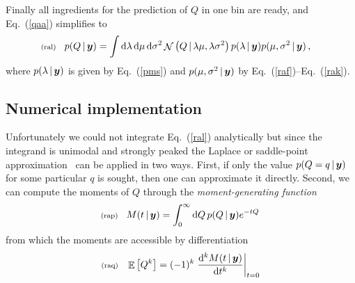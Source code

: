 \documentclass[11pt]{article}
\newcommand{\fredmargin}[1]{\todo[color=orange!40]{#1}} %
\newcommand{\lleq}[1]{\label{#1} }
\renewcommand{\lleq}[1]{\label{#1} {\scriptstyle {\rm (#1)}} \hspace*{2ex} }
\newcommand{\cond}{\,|\,}
\newcommand{\refeq}[1]{Eq.~(\ref{#1})}
\DeclareMathOperator{\Expect}{\mathbb{E}}
\newcommand{\expect}[1]{\Expect\left[#1\right]}
\DeclareMathOperator{\GaussianDist}{\mathcal{N}}
\newcommand{\Lumtot}{Q}
\newcommand{\lumtot}{q}
\newcommand{\rmdx}[1]{\dd{#1}} %
\begin{document}
  Finally all ingredients for the prediction of $\Lumtot$ in one bin are
  ready, and \refeq{qaa} simplifies to
\begin{align}
  \lleq{ral}
  p(\Lumtot \cond \bmy) &= \int \rmdx{\lambda} \rmdx{\mu} \rmdx{\sigma^2} \GaussianDist \left( \Lumtot \cond \lambda \mu, \lambda \sigma^2 \right) p(\lambda \cond \bmy) p( \mu, \sigma^2 \cond \bmy) \,,
\end{align}
where $ p(\lambda \cond \bmy)$ is given by \refeq{pms} and
$ p( \mu, \sigma^2 \cond \bmy)$ by
\refeq{raf}--\refeq{rak}.

\subsection{Numerical implementation}\label{sec:asympt-numeric}

Unfortunately we could not integrate \refeq{ral} analytically but
since the integrand is unimodal and strongly peaked the Laplace or
saddle-point approximation~\cite[Ch. 27]{mackay2003information} can be
applied in two ways. First, if only the value
$p(\Lumtot=\lumtot \cond \bmy)$ for some particular $q$ is sought,
then one can approximate it directly. Second, we can compute the
moments of $\Lumtot$ through the \emph{moment-generating
  function}\fredmargin{ref}
\begin{align}
  \lleq{rap}
  M(t \cond \bmy) = \int_0^{\infty} \rmdx{\Lumtot} p(\Lumtot \cond \bmy) e^{-t \Lumtot} \,
\end{align}
from which the moments are accessible by differentiation
\begin{align}
  \lleq{raq}
  \expect{\Lumtot^k} = (-1)^k \eval{\dv[k]{M(t \cond \bmy)}{t}}_{t=0}
\end{align}
\end{document}
